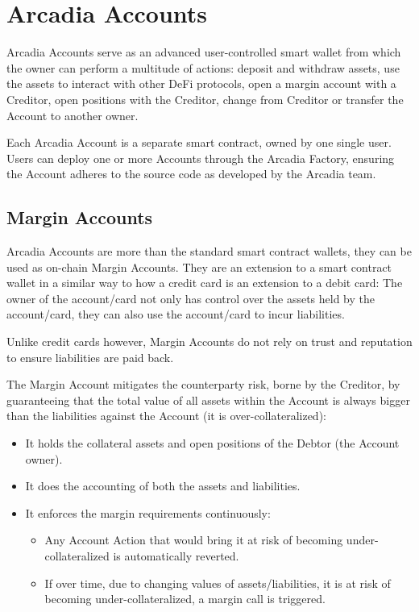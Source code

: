 \documentclass[sigconf,nonacm]{acmart}
\begin{document}
\section{Arcadia Accounts}
\label{sec:arcadia-accounts}
Arcadia Accounts serve as an advanced user-controlled smart wallet from which the owner can perform a multitude of actions: deposit and withdraw assets,
use the assets to interact with other DeFi protocols, open a margin account with a Creditor, open positions with the Creditor,
change from Creditor or transfer the Account to another owner.

Each Arcadia Account is a separate smart contract, owned by one single user.
Users can deploy one or more Accounts through the Arcadia Factory, ensuring the Account adheres to the source code as developed by the Arcadia team.

\subsection{Margin Accounts}
\label{subsec:margin-accounts}
Arcadia Accounts are more than the standard smart contract wallets, they can be used as on-chain Margin Accounts.
They are an extension to a smart contract wallet in a similar way to how a credit card is an extension to a debit card:
The owner of the account/card not only has control over the assets held by the account/card,
they can also use the account/card to incur liabilities.

Unlike credit cards however, Margin Accounts do not rely on trust and reputation to ensure liabilities are paid back.

The Margin Account mitigates the counterparty risk, borne by the Creditor,
by guaranteeing that the total value of all assets within the Account is always bigger than the liabilities against the Account (it is over-collateralized):
\begin{itemize}
    \item It holds the collateral assets and open positions of the Debtor (the Account owner).
    \item It does the accounting of both the assets and liabilities.
    \item It enforces the margin requirements continuously:
    \begin{itemize}
        \item Any Account Action that would bring it at risk of becoming under-collateralized is automatically reverted.
        \item If over time, due to changing values of assets/liabilities, it is at risk of becoming under-collateralized, a margin call is triggered.
    \end{itemize}
\end{itemize}
\end{document}

